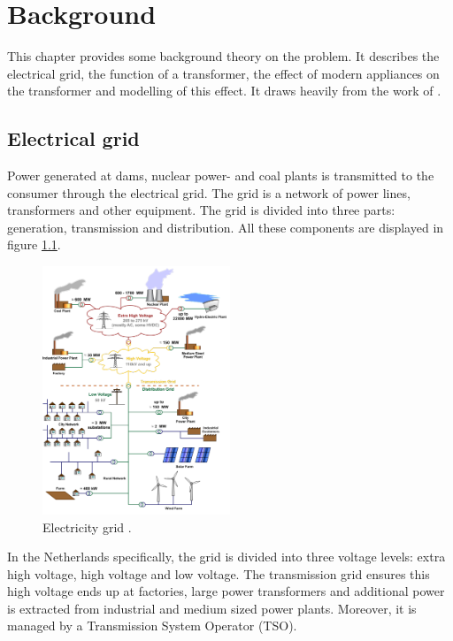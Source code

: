 \chapter{Background} \label{sec:background}

This chapter provides some background theory on the problem. It describes the electrical grid, the function of a transformer, 
the effect of modern appliances on the transformer and modelling of this effect. It draws heavily from the work of \cite{vanDijk2022}.

\section{Electrical grid}
\label{sec:grid}
Power generated at dams, nuclear power- and coal plants is transmitted to the consumer through the electrical grid. The grid is a network of power lines, transformers and other equipment. 
The grid is divided into three parts: generation, transmission and distribution. All these components are displayed in
figure \ref{fig:grid}.
\begin{figure}[H]
    \centeringP
    \includegraphics[width=0.5\textwidth]{img/distribution grid.png}
    \caption{Electricity grid \cite{mBizon2010}.}
    \label{fig:grid}
\end{figure} 
In the Netherlands specifically, the grid is divided into three voltage levels: extra high voltage, high voltage and low voltage.
The transmission grid ensures this high voltage ends up at factories, large power transformers and additional power is extracted from industrial and medium sized power plants.
Moreover, it is managed by a Transmission System Operator (TSO). 

